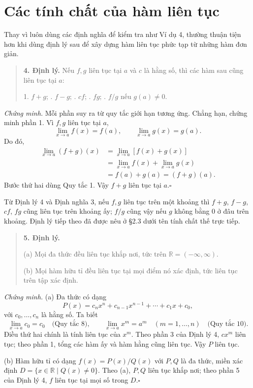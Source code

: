 \documentclass[12pt,a4paper]{article}
\begin{document}
\section*{Các tính chất của hàm liên tục}
Thay vì luôn dùng các định nghĩa để kiểm tra như Ví dụ 4, thường thuận tiện hơn khi dùng định lý sau để xây dựng hàm liên tục phức tạp từ những hàm đơn giản.
\begin{quote}\textbf{4. Định lý.} Nếu $f,g$ liên tục tại $a$ và $c$ là hằng số, thì các hàm sau cũng liên tục tại $a$:

1. $f+g$; . $f-g$; . $cf$; . $fg$; . $f/g$ nếu $g(a)\ne0$.
\end{quote}
\noindent\textit{Chứng minh.} Mỗi phần suy ra từ quy tắc giới hạn tương ứng. Chẳng hạn, chứng minh phần 1. Vì $f,g$ liên tục tại $a$,
\[\lim_{x\to a}f(x)=f(a),\qquad\lim_{x\to a}g(x)=g(a).\]
Do đó,
\begin{align*}
\lim_{x\to a}(f+g)(x)&=\lim_{x\to a}[f(x)+g(x)]\\
&=\lim_{x\to a}f(x)+\lim_{x\to a}g(x)\\
&=f(a)+g(a)=(f+g)(a).
\end{align*}
Bước thứ hai dùng Quy tắc 1. Vậy $f+g$ liên tục tại $a$.\hfill$\square$

Từ Định lý 4 và Định nghĩa 3, nếu $f,g$ liên tục trên một khoảng thì $f+g$, $f-g$, $cf$, $fg$ cũng liên tục trên khoảng ấy; $f/g$ cũng vậy nếu $g$ không bằng 0 ở đâu trên khoảng. Định lý tiếp theo đã được nêu ở §2.3 dưới tên tính chất thế trực tiếp.
\begin{quote}\textbf{5. Định lý.}

(a) Mọi đa thức đều liên tục khắp nơi, tức trên $\mathbb R=(-\infty,\infty)$.

(b) Mọi hàm hữu tỉ đều liên tục tại mọi điểm nó xác định, tức liên tục trên tập xác định.
\end{quote}
\noindent\textit{Chứng minh.} (a) Đa thức có dạng
\[P(x)=c_nx^n+c_{n-1}x^{n-1}+\cdots+c_1x+c_0,\]
với $c_0,\ldots,c_n$ là hằng số. Ta biết
\[\lim_{x\to a}c_0=c_0\quad\text{(Quy tắc 8)},\qquad\lim_{x\to a}x^m=a^m\quad(m=1,\ldots,n)\quad\text{(Quy tắc 10)}.\]
Điều thứ hai chính là tính liên tục của $x^m$. Theo phần 3 của Định lý 4, $cx^m$ liên tục; theo phần 1, tổng các hàm ấy và hàm hằng cũng liên tục. Vậy $P$ liên tục.

(b) Hàm hữu tỉ có dạng $f(x)=P(x)/Q(x)$ với $P,Q$ là đa thức, miền xác định $D=\{x\in\mathbb R\mid Q(x)\ne0\}$. Theo (a), $P,Q$ liên tục khắp nơi; theo phần 5 của Định lý 4, $f$ liên tục tại mọi số trong $D$.\hfill$\square$
\end{document}

